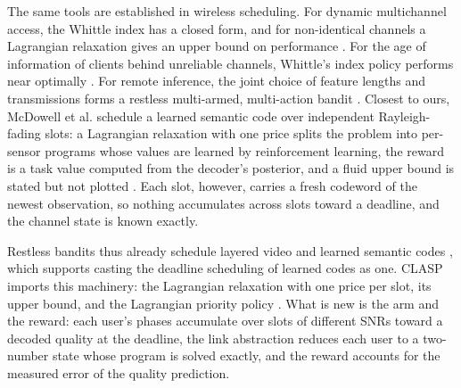 The same tools are established in wireless scheduling. For dynamic multichannel access, the
Whittle index has a closed form, and for non-identical channels a Lagrangian relaxation gives an
upper bound on performance \cite{LiuZhao10}. For the age of information of clients behind
unreliable channels, Whittle's index policy performs near optimally \cite{Kadota18}. For remote
inference, the joint choice of feature lengths and transmissions forms a restless multi-armed,
multi-action bandit \cite{Shisher23}. Closest to ours, McDowell et al. schedule a learned semantic
code over independent Rayleigh-fading slots: a Lagrangian relaxation with one price splits the
problem into per-sensor programs whose values are learned by reinforcement learning, the reward is
a task value computed from the decoder's posterior, and a fluid upper bound is stated but not
plotted \cite{McDowell26}. Each slot, however, carries a fresh codeword of the newest observation,
so nothing accumulates across slots toward a deadline, and the channel state is known exactly.

Restless bandits thus already schedule layered video \cite{Hosseini19} and learned semantic codes
\cite{McDowell26}, which supports casting the deadline scheduling of learned codes as one. CLASP
imports this machinery: the Lagrangian relaxation with one price per slot, its upper bound, and the
Lagrangian priority policy \cite{Brown20,Hao22}. What is new is the arm and the reward:
each user's phases accumulate over slots of different SNRs toward a decoded quality at the
deadline, the link abstraction reduces each user to a two-number state whose program is solved
exactly, and the reward accounts for the measured error of the quality prediction.
